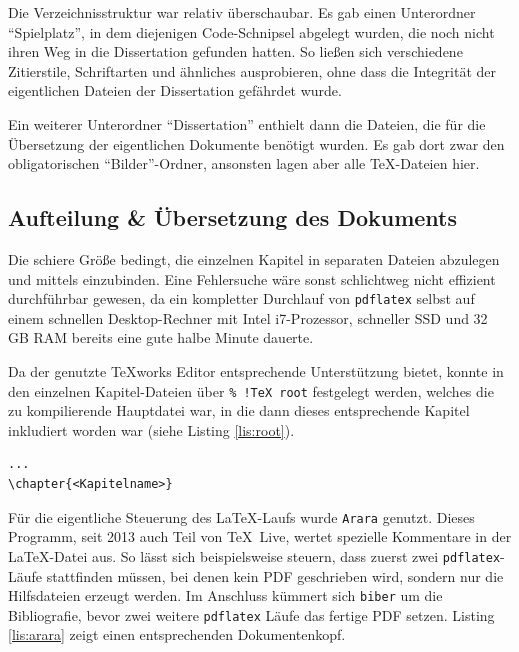 \documentclass[12pt,ngerman]{dtk}
\begin{document}
Die Verzeichnisstruktur war relativ überschaubar. Es gab einen Unterordner \enquote{Spielplatz}, in dem diejenigen Code-Schnipsel abgelegt wurden, die noch nicht ihren Weg in die Dissertation gefunden hatten. 
So ließen sich verschiedene Zitierstile, Schriftarten und ähnliches ausprobieren, ohne dass die Integrität der eigentlichen Dateien der Dissertation gefährdet wurde.

Ein weiterer Unterordner \enquote{Dissertation} enthielt dann die Dateien, die für die Übersetzung der eigentlichen Dokumente benötigt wurden. Es gab dort zwar den obligatorischen \enquote{Bilder}-Ordner, ansonsten lagen aber alle TeX-Dateien hier.

\subsection{Aufteilung \& Übersetzung des Dokuments}

Die schiere Größe bedingt, die einzelnen Kapitel in separaten Dateien abzulegen und mittels \verb|| einzubinden. Eine Fehlersuche wäre sonst schlichtweg nicht effizient durchführbar gewesen, da ein kompletter Durchlauf von \texttt{pdflatex} selbst auf einem schnellen Desktop-Rechner mit Intel i7-Prozessor, schneller SSD und 32 GB RAM bereits eine gute halbe Minute dauerte.

Da der genutzte \TeX works Editor entsprechende Unterstützung bietet, konnte in den einzelnen Kapitel-Dateien über \verb|% !TeX root| festgelegt werden, welches die zu kompilierende Hauptdatei war, in die dann dieses entsprechende Kapitel inkludiert worden war (siehe Listing \ref{lis:root}).

\begin{lstlisting}[caption={Definition der Hauptdatei in den einzelnen Kapitel-Dateien},label={lis:root}]
% !TeX root = Dissertation.tex
...
\chapter{<Kapitelname>}
\end{lstlisting}

Für die eigentliche Steuerung des \LaTeX-Laufs wurde \texttt{Arara} genutzt. Dieses Programm, seit 2013 auch Teil von \TeX\ Live, wertet spezielle Kommentare in der \LaTeX-Datei aus. So lässt sich beispielsweise steuern, dass zuerst zwei \texttt{pdflatex}-Läufe stattfinden müssen, bei denen kein PDF geschrieben wird, sondern nur die Hilfsdateien erzeugt werden. Im Anschluss kümmert sich \texttt{biber} um die Bibliografie, bevor zwei weitere \texttt{pdflatex} Läufe das fertige PDF setzen. Listing \ref{lis:arara} zeigt einen entsprechenden Dokumentenkopf.
\end{document}
